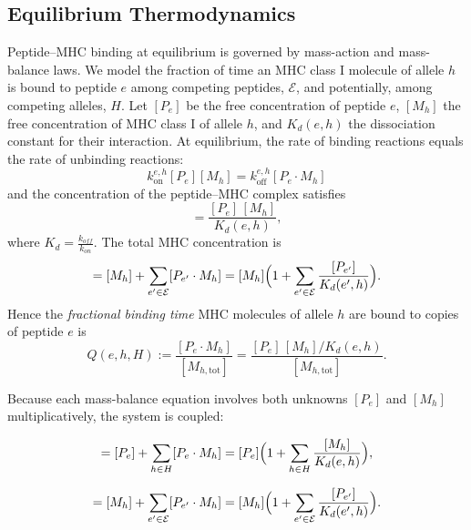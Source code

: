 \documentclass[11pt]{article}
\begin{document}
\subsection{Equilibrium Thermodynamics}
Peptide–MHC binding at equilibrium is governed by mass-action and mass-balance laws.  We model the fraction of time an MHC class I molecule of allele \(h\) is bound to peptide \(e\) among competing peptides, \(\mathcal E\), and potentially, among competing alleles, \(H\).  Let \([P_e]\) be the free concentration of peptide \(e\), \([M_h]\) the free concentration of MHC class I of allele \(h\), and \(K_{d}(e,h)\) the dissociation constant for their interaction.  At equilibrium, the rate of binding reactions equals the rate of unbinding reactions:
\begin{equation}
    k_{\text{on}}^{e,h} [P_e] [M_{h}] = k_{\text{off}}^{e,h} [P_e \cdot M_{h}]
\end{equation}
and the concentration of the peptide–MHC complex satisfies
\begin{equation}
[P_e \cdot M_h]
=\frac{[P_e]\,[M_h]}{K_{d}(e,h)},
\label{eq:mass-action}
\end{equation}
where \(K_{d} = \frac{k_{off}}{k_{on}}\).
The total MHC concentration is
\begin{equation}
[M_{h,\mathrm{tot}}]
=[M_h]+\sum_{e' \in \mathcal E}[P_{e'}\cdot M_h]
=[M_h]\Bigl(1+\sum_{e' \in \mathcal E}\frac{[P_{e'}]}{K_{d}(e',h)}\Bigr).
\end{equation}
Hence the \emph{fractional binding time} MHC molecules of allele \(h\) are bound to copies of peptide \(e\) is
\begin{equation}
Q(e,h,H)
:=\frac{[P_e\cdot M_h]}{[M_{h,\mathrm{tot}}]}
= \frac{[P_e]\, [M_h] / K_{d}(e,h)}{[M_{h,\mathrm{tot}}]}.
\label{eq:fi_h}
\end{equation}

Because each mass-balance equation involves both unknowns \([P_e]\) and \([M_h]\) multiplicatively, the system is coupled:

\begin{equation}
[P_{e,\mathrm{tot}}]
= [P_e] + \sum_{h \in H} [P_e \cdot M_h]
= [P_e]\Bigl(1 + \sum_{h \in H} \frac{[M_h]}{K_{d}(e,h)}\Bigr),
\label{eq:P_tot}
\end{equation}

\begin{equation}
[M_{h,\mathrm{tot}}]
= [M_h] + \sum_{e' \in \mathcal E} [P_{e'} \cdot M_h]
= [M_h]\Bigl(1 + \sum_{e' \in \mathcal E} \frac{[P_{e'}]}{K_{d}(e',h)}\Bigr).
\label{eq:M_tot}
\end{equation}
\end{document}

